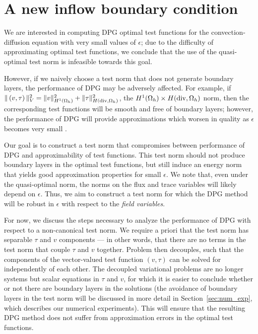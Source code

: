 \section{A new inflow boundary condition}

We are interested in computing DPG optimal test functions for the convection-diffusion equation with very small values of $\epsilon$; due to the difficulty of approximating optimal test functions, we conclude that the use of the quasi-optimal test norm is infeasible towards this goal. 

However, if we naively choose a test norm that does not generate boundary layers, the performance of DPG may be adversely affected. For example, if $\|\left(v,\tau\right)\|_V^2 = \|v\|_{H^1(\Omega_h)}^2 + \|\tau\|^2_{H({\rm div},\Omega_h)}$, the $H^1(\Omega_h)\times H({\rm div},\Omega_h)$ norm, then the corresponding test functions will be smooth and free of boundary layers; however, the performance of DPG will provide approximations which worsen in quality as $\epsilon$ becomes very small \cite{DPG3,DPGrobustness}. 

Our goal is to construct a test norm that compromises between performance of DPG and approximability of test functions.  This test norm should not produce boundary layers in the optimal test functions, but still induce an energy norm that yields good approximation properties for small $\epsilon$. We note that, even under the quasi-optimal norm, the norms on the flux and trace variables will likely depend on $\epsilon$. Thus, we aim to construct a test norm for which the DPG method will be robust in $\epsilon$ with respect to the \emph{field variables}. 

For now, we discuss the steps necessary to analyze the performance of DPG with respect to a non-canonical test norm. We require a priori that the test norm has separable $\tau$ and $v$ components --- in other words, that there are no terms in the test norm that couple $\tau$ and $v$ together. Problem  then decouples, such that the components of the vector-valued test function $\left(v,\tau\right)$ can be solved for independently of each other. The decoupled variational problems are no longer systems but scalar equations in $\tau$ and $v$, for which it is easier to conclude whether or not there are boundary layers in the solutions (the avoidance of boundary layers in the test norm will be discussed in more detail in Section~\ref{sec:num_exp}, which describes our numerical experiments). This will ensure that the resulting DPG method does not suffer from approximation errors in the optimal test functions.

